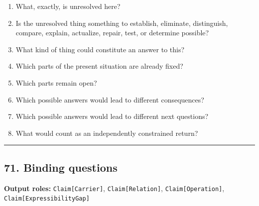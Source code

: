 \documentclass[
]{article}
\providecommand{\tightlist}{%
  \setlength{\itemsep}{0pt}\setlength{\parskip}{0pt}}
\begin{document}
\begin{enumerate}
\def\labelenumi{\arabic{enumi}.}
\tightlist
\item
  What, exactly, is unresolved here?
\item
  Is the unresolved thing something to establish, eliminate,
  distinguish, compare, explain, actualize, repair, test, or determine
  possible?
\item
  What kind of thing could constitute an answer to this?
\item
  Which parts of the present situation are already fixed?
\item
  Which parts remain open?
\item
  Which possible answers would lead to different consequences?
\item
  Which possible answers would lead to different next questions?
\item
  What would count as an independently constrained return?
\end{enumerate}

\begin{center}\rule{0.5\linewidth}{0.5pt}\end{center}

\subsection{71. Binding questions}\label{binding-questions}

\textbf{Output roles:} \texttt{Claim{[}Carrier{]}},
\texttt{Claim{[}Relation{]}}, \texttt{Claim{[}Operation{]}},
\texttt{Claim{[}ExpressibilityGap{]}}
\end{document}
